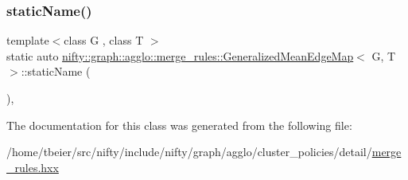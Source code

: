 \mbox{\label{classnifty_1_1graph_1_1agglo_1_1merge__rules_1_1GeneralizedMeanEdgeMap_a1aa5fc876183432739c97f9b534456b1}} 
\subsubsection{\texorpdfstring{static\+Name()}{staticName()}}
{\footnotesize\ttfamily template$<$class G , class T $>$ \\
static auto \hyperlink{classnifty_1_1graph_1_1agglo_1_1merge__rules_1_1GeneralizedMeanEdgeMap}{nifty\+::graph\+::agglo\+::merge\+\_\+rules\+::\+Generalized\+Mean\+Edge\+Map}$<$ G, T $>$\+::static\+Name (\begin{DoxyParamCaption}{ }\end{DoxyParamCaption})\hspace{0.3cm}{\ttfamily [inline]}, {\ttfamily [static]}}



The documentation for this class was generated from the following file\+:\begin{DoxyCompactItemize}
\item 
/home/tbeier/src/nifty/include/nifty/graph/agglo/cluster\+\_\+policies/detail/\hyperlink{merge__rules_8hxx}{merge\+\_\+rules.\+hxx}\end{DoxyCompactItemize}
